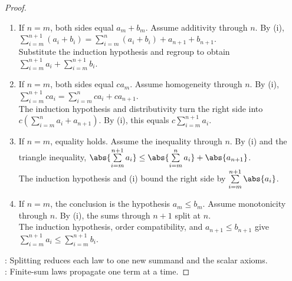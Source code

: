 \begin{proposition}
\begin{proof}
\begin{enumerate}[label=(\roman*)]
\item If $n=m$, both sides equal $a_m+b_m$. Assume additivity through $n$. By (i), $\sum\limits_{i=m}^{n+1}(a_i+b_i)=\sum\limits_{i=m}^{n}(a_i+b_i)+a_{n+1}+b_{n+1}$.\\
Substitute the induction hypothesis and regroup to obtain $\sum\limits_{i=m}^{n+1}a_i+\sum\limits_{i=m}^{n+1}b_i$.
\item If $n=m$, both sides equal $ca_m$. Assume homogeneity through $n$. By (i), $\sum\limits_{i=m}^{n+1}ca_i=\sum\limits_{i=m}^{n}ca_i+ca_{n+1}$.\\
The induction hypothesis and distributivity turn the right side into $c(\sum\limits_{i=m}^{n}a_i+a_{n+1})$. By (i), this equals $c\sum\limits_{i=m}^{n+1}a_i$.
\item If $n=m$, equality holds. Assume the inequality through $n$. By (i) and the triangle inequality, $\abs{\sum\limits_{i=m}^{n+1}a_i}\leq\abs{\sum\limits_{i=m}^{n}a_i}+\abs{a_{n+1}}$.\\
The induction hypothesis and (i) bound the right side by $\sum\limits_{i=m}^{n+1}\abs{a_i}$.
\item If $n=m$, the conclusion is the hypothesis $a_m\leq b_m$. Assume monotonicity through $n$. By (i), the sums through $n+1$ split at $n$.\\
The induction hypothesis, order compatibility, and $a_{n+1}\leq b_{n+1}$ give $\sum\limits_{i=m}^{n+1}a_i\leq\sum\limits_{i=m}^{n+1}b_i$.
\end{enumerate}
: Splitting reduces each law to one new summand and the scalar axioms.\\
: Finite-sum laws propagate one term at a time.
\end{proof}
\end{proposition}
